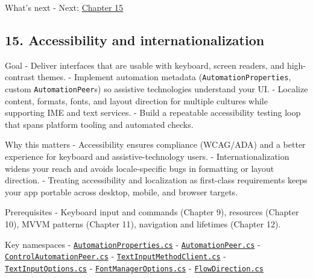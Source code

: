 What's next - Next: \href{Chapter15.md}{Chapter 15}

\newpage

\subsection{15. Accessibility and
internationalization}\label{accessibility-and-internationalization}

Goal - Deliver interfaces that are usable with keyboard, screen readers,
and high-contrast themes. - Implement automation metadata
(\passthrough{\lstinline!AutomationProperties!}, custom
\passthrough{\lstinline!AutomationPeer!}s) so assistive technologies
understand your UI. - Localize content, formats, fonts, and layout
direction for multiple cultures while supporting IME and text services.
- Build a repeatable accessibility testing loop that spans platform
tooling and automated checks.

Why this matters - Accessibility ensures compliance (WCAG/ADA) and a
better experience for keyboard and assistive-technology users. -
Internationalization widens your reach and avoids locale-specific bugs
in formatting or layout direction. - Treating accessibility and
localization as first-class requirements keeps your app portable across
desktop, mobile, and browser targets.

Prerequisites - Keyboard input and commands (Chapter 9), resources
(Chapter 10), MVVM patterns (Chapter 11), navigation and lifetimes
(Chapter 12).

Key namespaces -
\href{https://github.com/AvaloniaUI/Avalonia/blob/master/src/Avalonia.Controls/Automation/AutomationProperties.cs}{\passthrough{\lstinline!AutomationProperties.cs!}}
-
\href{https://github.com/AvaloniaUI/Avalonia/blob/master/src/Avalonia.Controls/Automation/Peers/AutomationPeer.cs}{\passthrough{\lstinline!AutomationPeer.cs!}}
-
\href{https://github.com/AvaloniaUI/Avalonia/blob/master/src/Avalonia.Controls/Automation/Peers/ControlAutomationPeer.cs}{\passthrough{\lstinline!ControlAutomationPeer.cs!}}
-
\href{https://github.com/AvaloniaUI/Avalonia/blob/master/src/Avalonia.Base/Input/TextInput/TextInputMethodClient.cs}{\passthrough{\lstinline!TextInputMethodClient.cs!}}
-
\href{https://github.com/AvaloniaUI/Avalonia/blob/master/src/Avalonia.Base/Input/TextInput/TextInputOptions.cs}{\passthrough{\lstinline!TextInputOptions.cs!}}
-
\href{https://github.com/AvaloniaUI/Avalonia/blob/master/src/Avalonia.Base/Media/FontManagerOptions.cs}{\passthrough{\lstinline!FontManagerOptions.cs!}}
-
\href{https://github.com/AvaloniaUI/Avalonia/blob/master/src/Avalonia.Visuals/FlowDirection.cs}{\passthrough{\lstinline!FlowDirection.cs!}}

